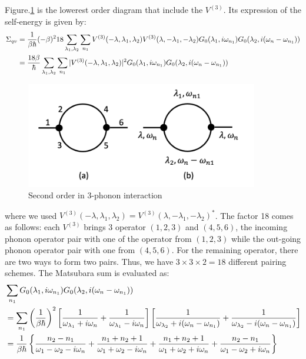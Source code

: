 \documentclass{article}
\begin{document}
\pagebreak
Figure.\ref{diagram2} is the lowerest order diagram that include the $V^{(3)}$. 
Its expression of the self-energy is given by:
\begin{align}
    \Sigma_{qv} &= \frac{1}{\beta\hbar} (-\beta)^2 18 \sum_{\lambda_1,\lambda_2}\sum_{n_1} V^{(3)}(-\lambda,\lambda_1,\lambda_2) V^{(3)}(\lambda,-\lambda_1,-\lambda_2) 
            G_0(\lambda_1,i\omega_{n_1})G_0(\lambda_2,i(\omega_n-\omega_{n_1})) \notag \\ 
           &= \frac{18\beta}{\hbar} \sum_{\lambda_1,\lambda_2}\sum_{n_1} |V^{(3)}(-\lambda,\lambda_1,\lambda_2)|^2 
           G_0(\lambda_1,i\omega_{n_1})G_0(\lambda_2,i(\omega_n-\omega_{n_1})) \notag \label{sigma2}
\end{align}
\begin{figure}[h!]
    \centering
    \includegraphics[width=4in]{img/self.energy.2.png}
    \caption{Second order in 3-phonon interaction}
    \label{diagram2}
\end{figure}
where we used $V^{(3)}(-\lambda,\lambda_1,\lambda_2) = V^{(3)}(\lambda,-\lambda_1,-\lambda_2)^*$. The factor 18 comes as follows:
each $V^{(3)}$ brings 3 operator $(1,2,3)$ and $(4,5,6)$, the incoming phonon operator pair with one of the operator from $(1,2,3)$ while 
the out-going phonon operator pair with one from $(4,5,6)$. For the remaining operator, there are two ways to form two pairs. Thus, we have
$3\times 3\times 2 = 18$ different pairing schemes.
The Matsubara sum is evaluated as:
\begin{align}
    &\sum_{n_1} G_0(\lambda_1,i\omega_{n_1})G_0(\lambda_2,i(\omega_n-\omega_{n_1})) \notag \\
    &= \sum_{n_1} \left(\frac{1}{\beta\hbar}\right)^2  \left[ \frac{1}{\omega_{\lambda_1}+i\omega_n} + \frac{1}{\omega_{\lambda_1}-i\omega_n} \right]
                                                       \left[ \frac{1}{\omega_{\lambda_2}+i(\omega_n-\omega_{n_1})} + \frac{1}{\omega_{\lambda_2}-i(\omega_n-\omega_{n_1})} \right] \notag \\
    &= \frac{1}{\beta\hbar} \left\{ \frac{n_2-n_1}{\omega_1 - \omega_2 - i\omega_n} + \frac{n_1+n_2+1}{\omega_1 + \omega_2 - i\omega_n} + \frac{n_1+n_2+1}{\omega_1 + \omega_2 + i\omega_n} + \frac{n_2-n_1}{\omega_1 - \omega_2 + i\omega_n} \right\}
\end{align}
\end{document}
